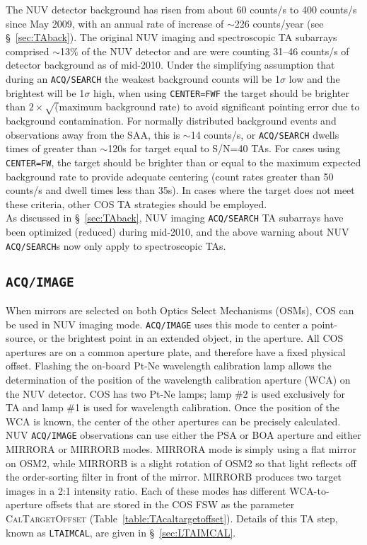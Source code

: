 \documentclass[12pt]{article}
\begin{document}
The NUV detector background has risen from about 60 counts/s to 400 counts/s since May 2009, with an annual rate of increase of $\sim$226 counts/year (see \S~\ref{sec:TAback}).
The original NUV imaging and spectroscopic TA subarrays comprised $\sim$13\% of the NUV detector and are were counting 31--46 counts/s of detector background
as of mid-2010.
Under the simplifying assumption that during an \texttt{ACQ/SEARCH} the weakest background counts will be 1$\sigma$ low and the brightest will be 1$\sigma$ high, when using \texttt{CENTER=FWF} the target should be brighter than $2 \times \sqrt(\textrm{maximum background rate})$ to
avoid significant pointing error due to background contamination. For normally distributed background events and observations away from the SAA, this is $\sim$14 counts/s, or \texttt{ACQ/SEARCH} dwells times of greater than $\sim$120s for target equal to S/N=40 TAs.
For cases using \texttt{CENTER=FW},  the target should be brighter than or equal to the maximum expected background rate to provide adequate centering (count rates greater than 50 counts/s and dwell times less than 35s).
In cases where the target does not meet these criteria, other COS TA strategies should be employed.\\

As discussed in \S~\ref{sec:TAback}, NUV imaging \texttt{ACQ/SEARCH} TA subarrays have been optimized (reduced) during mid-2010, and the
above warning about NUV \texttt{ACQ/SEARCH}s now only apply to spectroscopic TAs.

\clearpage
\vspace{-0.3cm}
\subsection{\texttt{ACQ/IMAGE}}\label{sec:acqimage}
\vspace{-0.3cm}
When mirrors are selected on both Optics Select Mechanisms (OSMs), COS can be used in NUV imaging mode. \texttt{ACQ/IMAGE}
uses this mode to center a point-source, or the brightest point in an extended object, in the aperture.
All COS apertures are on a common aperture plate, and therefore have a fixed physical offset.
Flashing the on-board Pt-Ne wavelength calibration lamp allows the determination of the position
of the wavelength calibration aperture (WCA) on the NUV detector.
COS has two Pt-Ne lamps; lamp \#2 is used exclusively for TA and lamp \#1 is used for wavelength calibration. Once the position
of the WCA is known, the center of the other apertures can be precisely calculated.
NUV \texttt{ACQ/IMAGE} observations can use either the PSA or BOA aperture and either MIRRORA or MIRRORB modes.
MIRRORA mode is simply using a flat mirror on OSM2, while MIRRORB is a slight rotation of OSM2 so that light reflects off the order-sorting filter in front of the mirror.
MIRRORB produces two target images in a 2:1 intensity ratio.
Each of these modes has different WCA-to-aperture offsets that are stored in the COS FSW
as the parameter \textsc{CalTargetOffset} (Table~\ref{table:TAcaltargetoffset}).
Details of this TA step, known as \texttt{LTAIMCAL}, are given in \S~\ref{sec:LTAIMCAL}.
\end{document}

